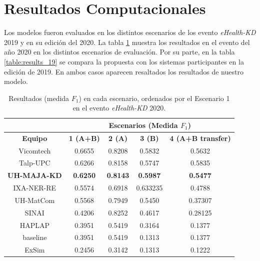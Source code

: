 \section{Resultados Computacionales}

Los modelos fueron evaluados en los distintos escenarios de los evento \textit{eHealth-KD} 2019 y en su edición del 2020. La tabla \ref{table:results_20} muestra los resultados en el evento del año 2020 en los distintos escenarios de evaluación. Por su parte, en la tabla \ref{table:results_19} se compara la propuesta con los sistemas participantes en la edición de 2019. En ambos casos aparecen resaltados los resultados de nuestro modelo.

\begin{table}[tb!]\centering
	
	\begin{tabular}{|c|c|c|c|c|}
		\hline
		&  \multicolumn{4}{c|}{\textbf{Escenarios (Medida $F_1$)}} \\
		\hline
		\textbf{Equipo} & \textbf{1 (A+B)} & \textbf{2 (A)} & \textbf{3 (B)} &  \textbf{4 (A+B transfer)}\\
		\hline
		Vicomtech & 0.6655 & 0.8208 & 0.5832 & 0.5632 \\
		Talp-UPC & 0.6266 & 0.8158 & 0.5747 & 0.5835  \\
		\textbf{UH-MAJA-KD} & \textbf{0.6250} & \textbf{0.8143} & \textbf{0.5987} & \textbf{0.5477} \\
		IXA-NER-RE & 0.5574 & 0.6918 & 0.633235 & 0.4788 \\
		UH-MatCom &	0.5568 & 0.7949 & 0.5450 & 0.37307 \\
		SINAI &	0.4206 & 0.8252 & 0.4617 & 0.28125 \\
		HAPLAP & 0.3951 & 0.5419 & 0.3164 & 0.1377 \\
		baseline & 0.3951 & 0.5419 & 0.1313 & 0.1377 \\
		ExSim &	0.2456 & 0.3142 & 0.1313 & 0.1222 \\
		\hline
	\end{tabular}
	\caption{Resultados (medida $F_1$) en cada escenario, ordenados por el Escenario 1 en el evento \textit{eHealth-KD} 2020.\label{table:results_20}}
\end{table}

